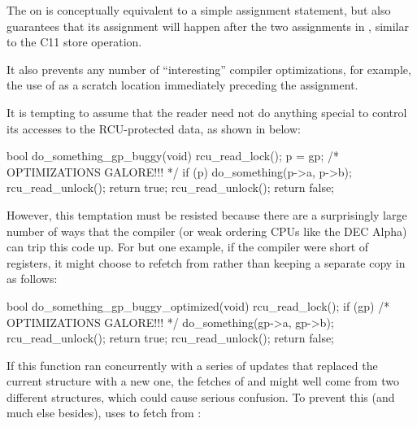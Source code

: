 \begin{fcvref}
The  on  %
is conceptually equivalent to a
simple assignment statement, but also guarantees that its assignment
will happen after the two assignments in , %
similar to the
C11  store operation.
\end{fcvref}
It also prevents any
number of ``interesting'' compiler optimizations, for example, the use of
 as a scratch location immediately preceding the assignment.

\QuickQuizEnd

It is tempting to assume that the reader need not do anything special to
control its accesses to the RCU-protected data, as shown in
 below:

\begin{VerbatimN}
	bool do_something_gp_buggy(void)
	{
		rcu_read_lock();
		p = gp;  /* OPTIMIZATIONS GALORE!!! */
		if (p) {
			do_something(p->a, p->b);
			rcu_read_unlock();
			return true;
		}
		rcu_read_unlock();
		return false;
	}
\end{VerbatimN}

However, this temptation must be resisted because there are a
surprisingly large number of ways that the compiler (or weak ordering
CPUs like the DEC Alpha) can trip this code up.
For but one example, if
the compiler were short of registers, it might choose to refetch from
 rather than keeping a separate copy in~ as follows:

\begin{VerbatimN}
	bool do_something_gp_buggy_optimized(void)
	{
		rcu_read_lock();
		if (gp) { /* OPTIMIZATIONS GALORE!!! */
			do_something(gp->a, gp->b);
			rcu_read_unlock();
			return true;
		}
		rcu_read_unlock();
		return false;
	}
\end{VerbatimN}

If this function ran concurrently with a series of updates that replaced
the current structure with a new one, the fetches of  and
 might well come from two different structures, which could
cause serious confusion.
To prevent this (and much else besides),
 uses  to fetch from :

